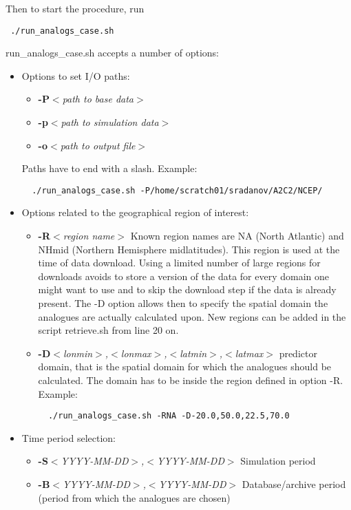 \documentclass[11p,a4paper]{article}
\begin{document}
Then to start the procedure, run
\begin{verbatim}
 ./run_analogs_case.sh
\end{verbatim}
run\_analogs\_case.sh accepts a number of options:
\begin{itemize}
 \item Options to set I/O paths:
 \begin{itemize}
  \item \textbf{-P}\textit{$<$path to base data$>$}
  \item \textbf{-p}\textit{$<$path to simulation data$>$}
  \item \textbf{-o}\textit{$<$path to output file$>$}
 \end{itemize}
 Paths have to end with a slash.
 Example:
 \begin{verbatim}
  ./run_analogs_case.sh -P/home/scratch01/sradanov/A2C2/NCEP/
 \end{verbatim}
 \item Options related to the geographical region of interest:
 \begin{itemize}
  \item \textbf{-R}\textit{$<$region name$>$} Known region names are NA (North Atlantic) and NHmid (Northern Hemisphere midlatitudes). This region is used at the time of data download. Using a limited number of large regions for downloads avoids to store a version of the data for every domain one might want to use and to skip the download step if the data is already present. The -D option allows then to specify the spatial domain the analogues are actually calculated upon. New regions can be added in the script retrieve.sh from line 20 on.
  \item \textbf{-D}\textit{$<$lonmin$>$,$<$lonmax$>$,$<$latmin$>$,$<$latmax$>$} predictor domain, that is the spatial domain for which the analogues should be calculated. The domain has to be inside the region defined in option -R. Example:
 \begin{verbatim}
  ./run_analogs_case.sh -RNA -D-20.0,50.0,22.5,70.0
 \end{verbatim}
 \end{itemize}
 \item Time period selection:
 \begin{itemize}
  \item \textbf{-S}\textit{$<$YYYY-MM-DD$>$,$<$YYYY-MM-DD$>$} Simulation period
  \item \textbf{-B}\textit{$<$YYYY-MM-DD$>$,$<$YYYY-MM-DD$>$} Database/archive period (period from which the analogues are chosen)

\end{itemize}
\end{itemize}
\end{document}
